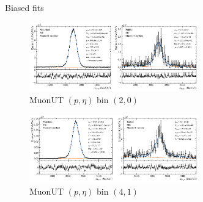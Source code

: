 \documentclass[xcolor={dvipsnames}]{beamer}
\begin{document}
\begin{frame}{Biased fits}
  \vspace{0.0cm}
  \begin{figure}[htb]
    \centering
    \includegraphics[width=0.65\textwidth]{Plots/MC_MuonUT_P_bin_2_ETA_bin_0_sim.pdf}
    \caption*{\small MuonUT $(p, \eta)$ bin $(2, 0)$}
  \end{figure}
  \vspace{-0.5cm}
  \begin{figure}[htb]
    \centering
    \includegraphics[width=0.65\textwidth]{Plots/MC_MuonUT_P_bin_4_ETA_bin_1_sim.pdf}
    \caption*{\small MuonUT $(p, \eta)$ bin $(4, 1)$}
  \end{figure}
\end{frame}
\end{document}
